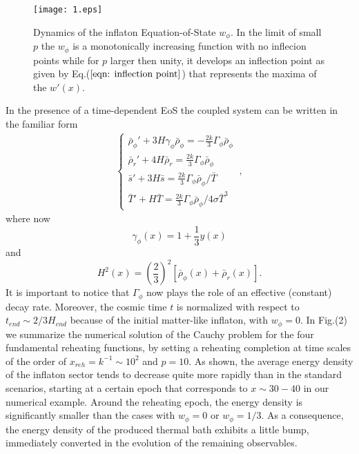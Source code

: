 \documentclass[%
aps,prd,nofootinbib,showkeys,a4paper,10pt
]{revtex4-2}
\begin{document}
\begin{figure}%
\centering
\texttt{[image: 1.eps]}
\caption{Dynamics of the inflaton Equation-of-State $w_{\phi}$. In the limit of small $p$ the $w_{\phi}$ is a monotonically increasing function
with no inflecion points while for $p$ larger then unity, it develops an inflection point as given by Eq.($\ref{eqn: inflection point}$) that
represents the maxima of the $w'(x)$.}
\label{fig: 1}
\end{figure}



In the presence of a time-dependent EoS the coupled system can be written in the familiar form 
\begin{eqnarray}\label{eqn:generalsystem_cont}
\begin{cases}
\bar{\rho}_{\phi}' + 3H\gamma_{\phi}\bar{\rho}_{\phi}=-\frac{2k}{3}\Gamma_{\phi}\bar{\rho}_{\phi} \\
\bar{\rho}_{r}' + 4H\bar{\rho}_{r}=\frac{2k}{3}\Gamma_{\phi}\bar{\rho}_{\phi}  \\ 
\bar{s}'+3H\bar{s}=\frac{2k}{3}\Gamma_{\phi}\bar{\rho}_{\phi}/\bar{T} \\
\bar{T}'+H\bar{T} = \frac{2k}{3}\Gamma_{\phi}\bar{\rho}_{\phi}/4\sigma \bar{T}^3
\end{cases} \ ,
\end{eqnarray}
where now
\begin{equation}
\gamma_{\phi}(x)=1+\frac{1}{3}y(x)
\end{equation}
and
\begin{equation}
H^2(x)=\left(\frac{2}{3}\right)^2\left[\bar{\rho}_{\phi}(x)+\bar{\rho}_r(x)\right].
\end{equation}
It is important to notice that $\Gamma_{\phi}$ now plays the role of an effective (constant) decay rate. 
Moreover, the cosmic time $t$ is normalized with respect to $t_{end}\sim 2/3H_{end}$ because of the  initial matter-like inflaton, with $w_{\phi}=0$. 
In Fig.(2) we summarize the numerical solution \cite{52} of the Cauchy problem for the four fundamental reheating functions, 
by setting a reheating completion at time scales of the order of $x_{reh}=k^{-1}\sim 10^2$ and $p=10$.
As shown, the average energy density of the inflaton sector tends to decrease quite more rapidly than in the standard scenarios, 
starting at a certain epoch that corresponds to $x\sim 30-40$ in our numerical example. Around the reheating epoch, 
the energy density is significantly smaller than the cases with $w_{\phi}=0$ or $w_{\phi}=1/3$. As a consequence, 
the energy density of the produced thermal bath exhibits a little bump, immediately converted 
in the evolution of the remaining observables.
\end{document}
